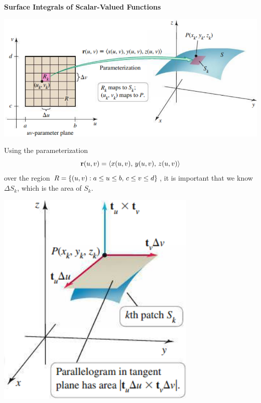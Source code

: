 \documentclass[../mathNotesPreamble]{subfiles}
\begin{document}
  \noindent
  \textbf{Surface Integrals  of Scalar-Valued Functions}

  \begin{center}
    \includegraphics[width=0.8\linewidth]{../images/briggs_17_06/fig17_47}
  \end{center}
  Using the parameterization 
    \[{\mathbf{r}}(u,v)={\left\langle x(u,v),\, y(u,v),\,z(u,v) \right\rangle}\]
  over the region $R={\left\{(u,v): a\leq u\leq b,\, c\leq v\leq d\right\}}$, it is important that we know $\Delta S_k$, which is the area of $S_k$.
  \begin{center}
    \includegraphics[width=0.35\linewidth]{../images/briggs_17_06/fig17_48}
  \end{center}
  \pagebreak
\end{document}
